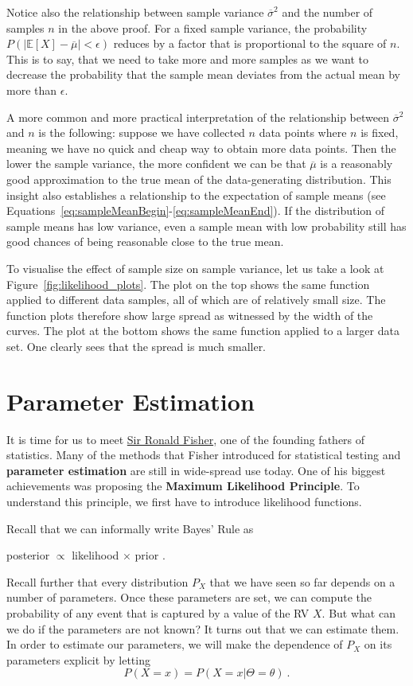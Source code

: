 Notice also the relationship between sample variance $ \overline{\sigma}^{2} $ and the number of samples $ n $ in the above proof. For a fixed sample variance, the
probability $ P(|\mathbb{E}[X] - \overline{\mu}| < \epsilon) $ reduces by a factor that is proportional to the square of $ n $. This is to say, that we need to take
more and more samples as we want to decrease the probability that the sample mean deviates from the actual mean by more than $ \epsilon $. 

A more common and more practical interpretation of the relationship between $ \overline{\sigma}^{2} $ and $ n $ is the following: suppose we have collected $ n $ data
points where $ n $ is fixed, meaning we have no quick and cheap way to obtain more data points. Then the lower the sample variance, the more confident we can be
that $ \overline{\mu} $ is a reasonably good approximation to the true mean of the data-generating distribution. This insight also establishes a relationship to
the expectation of sample means (see Equations~\eqref{eq:sampleMeanBegin}-\eqref{eq:sampleMeanEnd}). If the distribution of sample means has low variance, even 
a sample mean with low probability still has good chances of being reasonable close to the true mean.

To visualise the effect of sample size on sample variance, let us take a look at Figure~\ref{fig:likelihood_plots}. The plot on the top shows the same function applied
to different data samples, all of which are of relatively small size. The function plots therefore show large spread as witnessed by the width of the curves. The 
plot at the bottom shows the same function applied to a larger data set. One clearly sees that the spread is much smaller.

\section{Parameter Estimation}

It is time for us to meet \href{https://en.wikipedia.org/wiki/Ronald_Fisher}{Sir Ronald Fisher}, 
one of the founding fathers of statistics. Many of the methods that Fisher introduced
for statistical testing and \textbf{parameter estimation} are still in wide-spread use today. One of his biggest achievements was proposing the 
\textbf{Maximum Likelihood Principle}. To understand this principle, we first have to introduce likelihood functions.

Recall that we can informally write Bayes' Rule as 
\begin{center}
posterior $ \propto $ likelihood $ \times $ prior .
\end{center}
Recall further that every distribution $ P_{X} $ that we have seen so far depends on a number of parameters. 
Once these parameters are set, we can compute the probability of 
any event that is  captured by a value of the RV $ X $. But what can we do if the parameters are not known? It turns out that we can estimate them. In order to 
estimate our parameters, we will make the dependence of $ P_{X} $ on its parameters explicit by letting
\begin{equation}
P(X=x) = P(X=x|\Theta = \theta) \ . 
\end{equation}

